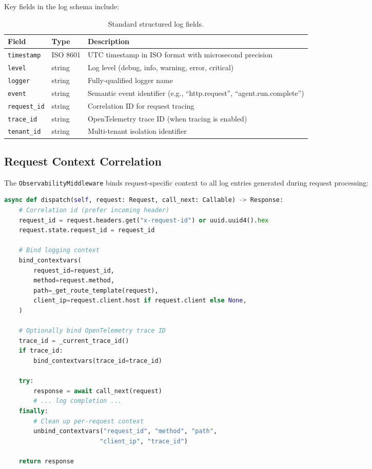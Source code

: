 Key fields in the log schema include:

\begin{table}[ht]
\centering
\caption{Standard structured log fields.}
\label{tab:log-fields}
\begin{tabularx}{\textwidth}{llX}
\hline
\textbf{Field} & \textbf{Type} & \textbf{Description} \\
\hline
\texttt{timestamp} & ISO 8601 & UTC timestamp in ISO format with microsecond precision \\
\texttt{level} & string & Log level (debug, info, warning, error, critical) \\
\texttt{logger} & string & Fully-qualified logger name \\
\texttt{event} & string & Semantic event identifier (e.g., ``http.request'', ``agent.run.complete'') \\
\texttt{request\_id} & string & Correlation ID for request tracing \\
\texttt{trace\_id} & string & OpenTelemetry trace ID (when tracing is enabled) \\
\texttt{tenant\_id} & string & Multi-tenant isolation identifier \\
\hline
\end{tabularx}
\end{table}

\subsection{Request Context Correlation}

The \texttt{ObservabilityMiddleware} binds request-specific context to all log entries generated during request processing:

\begin{lstlisting}[language=Python, caption={Request context binding in middleware}]
async def dispatch(self, request: Request, call_next: Callable) -> Response:
    # Correlation id (prefer incoming header)
    request_id = request.headers.get("x-request-id") or uuid.uuid4().hex
    request.state.request_id = request_id

    # Bind logging context
    bind_contextvars(
        request_id=request_id,
        method=request.method,
        path=_get_route_template(request),
        client_ip=request.client.host if request.client else None,
    )

    # Optionally bind OpenTelemetry trace ID
    trace_id = _current_trace_id()
    if trace_id:
        bind_contextvars(trace_id=trace_id)

    try:
        response = await call_next(request)
        # ... log completion ...
    finally:
        # Clean up per-request context
        unbind_contextvars("request_id", "method", "path", 
                          "client_ip", "trace_id")

    return response
\end{lstlisting}

